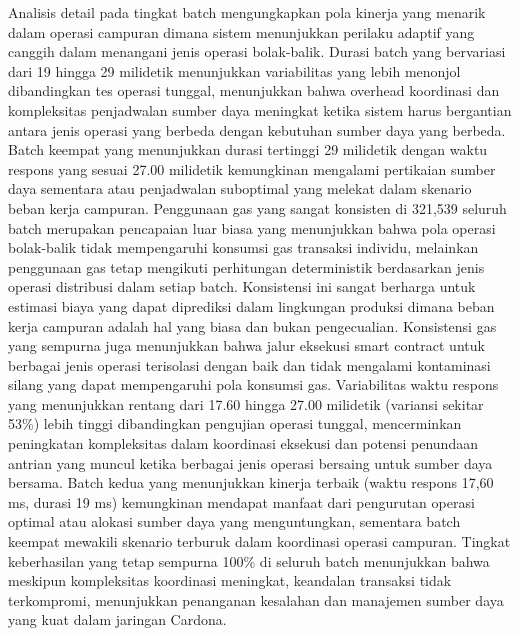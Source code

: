 Analisis detail pada tingkat batch mengungkapkan pola kinerja yang menarik dalam operasi campuran dimana sistem menunjukkan perilaku adaptif yang canggih dalam menangani jenis operasi bolak-balik. Durasi batch yang bervariasi dari 19 hingga 29 milidetik menunjukkan variabilitas yang lebih menonjol dibandingkan tes operasi tunggal, menunjukkan bahwa overhead koordinasi dan kompleksitas penjadwalan sumber daya meningkat ketika sistem harus bergantian antara jenis operasi yang berbeda dengan kebutuhan sumber daya yang berbeda. Batch keempat yang menunjukkan durasi tertinggi 29 milidetik dengan waktu respons yang sesuai 27.00 milidetik kemungkinan mengalami pertikaian sumber daya sementara atau penjadwalan suboptimal yang melekat dalam skenario beban kerja campuran. Penggunaan gas yang sangat konsisten di 321,539 seluruh batch merupakan pencapaian luar biasa yang menunjukkan bahwa pola operasi bolak-balik tidak mempengaruhi konsumsi gas transaksi individu, melainkan penggunaan gas tetap mengikuti perhitungan deterministik berdasarkan jenis operasi distribusi dalam setiap batch. Konsistensi ini sangat berharga untuk estimasi biaya yang dapat diprediksi dalam lingkungan produksi dimana beban kerja campuran adalah hal yang biasa dan bukan pengecualian. Konsistensi gas yang sempurna juga menunjukkan bahwa jalur eksekusi smart contract untuk berbagai jenis operasi terisolasi dengan baik dan tidak mengalami kontaminasi silang yang dapat mempengaruhi pola konsumsi gas. Variabilitas waktu respons yang menunjukkan rentang dari 17.60 hingga 27.00 milidetik (variansi sekitar 53\%) lebih tinggi dibandingkan pengujian operasi tunggal, mencerminkan peningkatan kompleksitas dalam koordinasi eksekusi dan potensi penundaan antrian yang muncul ketika berbagai jenis operasi bersaing untuk sumber daya bersama. Batch kedua yang menunjukkan kinerja terbaik (waktu respons 17,60 ms, durasi 19 ms) kemungkinan mendapat manfaat dari pengurutan operasi optimal atau alokasi sumber daya yang menguntungkan, sementara batch keempat mewakili skenario terburuk dalam koordinasi operasi campuran. Tingkat keberhasilan yang tetap sempurna 100\% di seluruh batch menunjukkan bahwa meskipun kompleksitas koordinasi meningkat, keandalan transaksi tidak terkompromi, menunjukkan penanganan kesalahan dan manajemen sumber daya yang kuat dalam jaringan Cardona.

